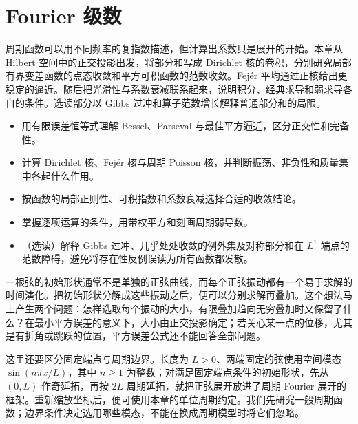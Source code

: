 \chapter{Fourier 级数}
\label{b2:ch:02}
\begin{chapterabstract}
周期函数可以用不同频率的复指数描述，但计算出系数只是展开的开始。本章从 Hilbert 空间中的正交投影出发，将部分和写成 Dirichlet 核的卷积，分别研究局部有界变差函数的点态收敛和平方可积函数的范数收敛。Fejér 平均通过正核给出更稳定的逼近。随后把光滑性与系数衰减联系起来，说明积分、经典求导和弱求导各自的条件。选读部分以 Gibbs 过冲和算子范数增长解释普通部分和的局限。
\end{chapterabstract}

\begin{learninggoals}
\begin{itemize}
\item\label{b2:item:02-goal-projection}用有限误差恒等式理解 Bessel、Parseval 与最佳平方逼近，区分正交性和完备性。
\item\label{b2:item:02-goal-kernel}计算 Dirichlet 核、Fejér 核与周期 Poisson 核，并判断振荡、非负性和质量集中各起什么作用。
\item\label{b2:item:02-goal-convergence}按函数的局部正则性、可积指数和系数衰减选择合适的收敛结论。
\item\label{b2:item:02-goal-operation}掌握逐项运算的条件，用带权平方和刻画周期弱导数。
\item\label{b2:item:02-goal-boundary}（选读）解释 Gibbs 过冲、几乎处处收敛的例外集及对称部分和在 \(L^1\) 端点的范数障碍，避免将存在性反例误读为所有函数都发散。
\end{itemize}
\end{learninggoals}

一根弦的初始形状通常不是单独的正弦曲线，而每个正弦振动都有一个易于求解的时间演化。把初始形状分解成这些振动之后，便可以分别求解再叠加。这个想法马上产生两个问题：怎样选取每个振动的大小，有限叠加趋向无穷叠加时又保留了什么？在最小平方误差的意义下，大小由正交投影确定；若关心某一点的位移，尤其是有折角或跳跃的位置，平方误差公式还不能回答全部问题。

\ProseParagraphBreak

这里还要区分固定端点与周期边界。长度为 \(L>0\)、两端固定的弦使用空间模态 \(\sin(n\pi x/L)\)，其中 \(n\geq1\) 为整数；对满足固定端点条件的初始形状，先从 \((0,L)\) 作奇延拓，再按 \(2L\) 周期延拓，就把正弦展开放进了周期 Fourier 展开的框架。重新缩放坐标后，便可使用本章的单位周期约定。我们先研究一般周期函数；边界条件决定选用哪些模态，不能在换成周期模型时将它们忽略。

